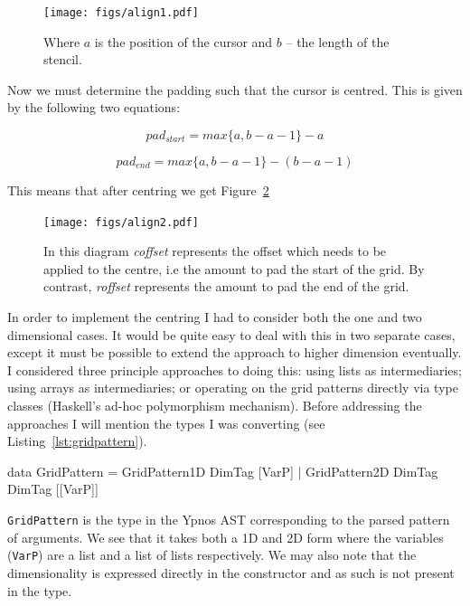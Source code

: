 \documentclass[12pt,a4paper,twoside]{scrbook}
\begin{document}
\begin{figure}[tb]
  \centering
  \texttt{[image: figs/align1.pdf]}
  \caption{Where $a$ is the position of the cursor and $b$ -- the length of the
    stencil.}
  \label{fig:cursor}
\end{figure}

Now we must determine the padding such that the cursor is centred. This is given
by the following two equations:

\[ pad_{start} = max \{a, b-a-1\} - a \]

\[ pad_{end} = max \{a, b-a-1\} - (b - a - 1) \]

This means that after centring we get Figure~\ref{fig:centredcursor}

\begin{figure}[tb]
  \centering
  \texttt{[image: figs/align2.pdf]}
  \caption{In this diagram \emph{coffset} represents the offset which needs to
    be applied to the centre, i.e the amount to pad the start of the grid. By
    contrast, \emph{roffset} represents the amount to pad the end of the
    grid. }
  \label{fig:centredcursor}
\end{figure}

In order to implement the centring I had to consider both the one and two
dimensional cases.  It would be quite easy to deal with this in two separate
cases, except it must be possible to extend the approach to higher dimension
eventually. I considered three principle approaches to doing this: using lists
as intermediaries; using arrays as intermediaries; or operating on the grid
patterns directly via type classes (Haskell's ad-hoc polymorphism mechanism).
Before addressing the approaches I will mention the types I was converting (see
Listing~\ref{lst:gridpattern}).

\begin{hflisting}[label={lst:gridpattern}, caption=The data type which stores
  the grid patterns in Ypnos. Notice that the dimensionality is not exposed in
  the type.]
data GridPattern =
    GridPattern1D DimTag [VarP] |
    GridPattern2D DimTag DimTag [[VarP]]
\end{hflisting}

\texttt{GridPattern} is the type in the Ypnos AST corresponding to the
parsed pattern of arguments. We see that it takes both a 1D and 2D form
where the variables (\texttt{VarP}) are a list and a list of lists
respectively. We may also note that the dimensionality is expressed
directly in the constructor and as such is not present in the type.
\end{document}
